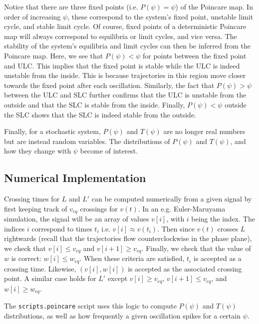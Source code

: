 \documentclass[letterpaper,12pt]{article}
\numberwithin{table}{section}
\numberwithin{figure}{section}
\numberwithin{equation}{section}
\begin{document}
\begin{flushleft}
\begin{figure}[h]
    \end{figure}
    Notice that there are three fixed points (i.e. $P(\psi) = \psi$) of the Poincare map. In order of increasing $\psi$, these correspond to the system's fixed point, unstable limit cycle, and stable limit cycle. Of course, fixed points of a deterministic Poincare map will always correspond to equilibria or limit cycles, and vice versa. The stability of the system's equilibria and limit cycles can then be inferred from the Poincare map. Here, we see that $P(\psi) < \psi$ for points between the fixed point and ULC. This implies that the fixed point is stable while the ULC is indeed unstable from the inside. This is because trajectories in this region move closer towards the fixed point after each oscillation. Similarly, the fact that $P(\psi) > \psi$ between the ULC and SLC further confirms that the ULC is unstable from the outside and that the SLC is stable from the inside. Finally, $P(\psi) < \psi$ outside the SLC shows that the SLC is indeed stable from the outside.

    Finally, for a stochastic system, $P(\psi)$ and $T(\psi)$ are no longer real numbers but are instead random variables. The distributions of $P(\psi)$ and $T(\psi)$, and how they change with $\psi$ become of interest.

    \subsection{Numerical Implementation}
    \label{sec:pmap-numerical}

    Crossing times for $L$ and $L'$ can be computed numerically from a given signal by first keeping track of $v_{eq}$ crossings for $v(t)$. In an e.g. Euler-Maruyama simulation, the signal will be an array of values $v[i]$, with $i$ being the index. The indices $i$ correspond to times $t_i$ i.e. $v[i] \approx v(t_i)$. Then since $v(t)$ crosses $L$ rightwards (recall that the trajectories flow counterclockwise in the phase plane), we check that $v[i] \leq v_{eq}$ and $v[i+1] \geq v_{eq}$. Finally, we check that the value of $w$ is correct: $w[i] \leq w_{eq}$. When these criteria are satisfied, $t_i$ is accepted as a crossing time. Likewise, $(v[i], w[i])$ is accepted as the associated crossing point. A similar case holds for $L'$ except $v[i] \geq v_{eq}$, $v[i+1] \leq v_{eq}$, and $w[i] \geq w_{eq}$.

    The \texttt{scripts.poincare} script uses this logic to compute $P(\psi)$ and $T(\psi)$ distributions, as well as how frequently a given oscillation spikes for a certain $\psi$.


\end{flushleft}
\end{document}
